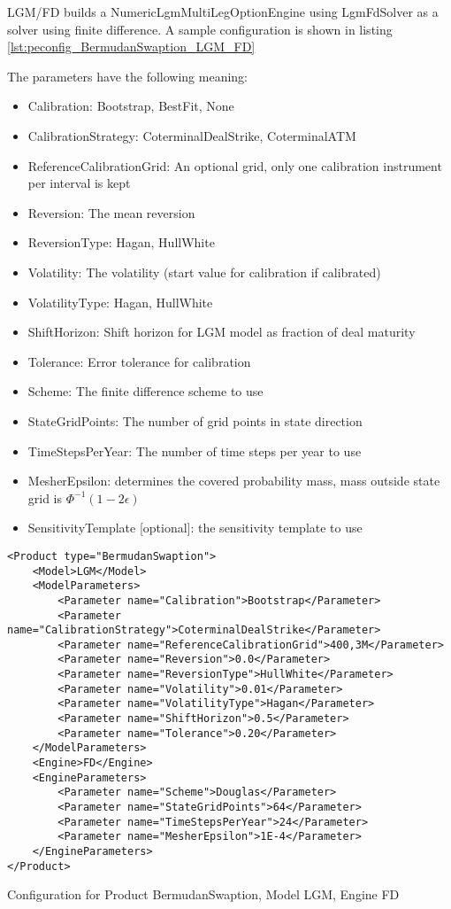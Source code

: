 LGM/FD builds a NumericLgmMultiLegOptionEngine using LgmFdSolver as a solver using finite difference. A sample
configuration is shown in listing \ref{lst:peconfig_BermudanSwaption_LGM_FD}

The parameters have the following meaning:

\begin{itemize}
\item Calibration: Bootstrap, BestFit, None
\item CalibrationStrategy: CoterminalDealStrike, CoterminalATM
\item ReferenceCalibrationGrid: An optional grid, only one calibration instrument per interval is kept
\item Reversion: The mean reversion
\item ReversionType: Hagan, HullWhite
\item Volatility: The volatility (start value for calibration if calibrated)
\item VolatilityType: Hagan, HullWhite
\item ShiftHorizon: Shift horizon for LGM model as fraction of deal maturity
\item Tolerance: Error tolerance for calibration
\item Scheme: The finite difference scheme to use
\item StateGridPoints: The number of grid points in state direction
\item TimeStepsPerYear: The number of time steps per year to use
\item MesherEpsilon: determines the covered probability mass, mass outside state grid is $\Phi^{-1}(1-2\epsilon)$
\item SensitivityTemplate [optional]: the sensitivity template to use 
\end{itemize}

\begin{longlisting}
\begin{verbatim}
<Product type="BermudanSwaption">
    <Model>LGM</Model>
    <ModelParameters>
        <Parameter name="Calibration">Bootstrap</Parameter>
        <Parameter name="CalibrationStrategy">CoterminalDealStrike</Parameter>
        <Parameter name="ReferenceCalibrationGrid">400,3M</Parameter>
        <Parameter name="Reversion">0.0</Parameter>
        <Parameter name="ReversionType">HullWhite</Parameter>
        <Parameter name="Volatility">0.01</Parameter>
        <Parameter name="VolatilityType">Hagan</Parameter>
        <Parameter name="ShiftHorizon">0.5</Parameter>
        <Parameter name="Tolerance">0.20</Parameter>
    </ModelParameters>
    <Engine>FD</Engine>
    <EngineParameters>
        <Parameter name="Scheme">Douglas</Parameter>
        <Parameter name="StateGridPoints">64</Parameter>
        <Parameter name="TimeStepsPerYear">24</Parameter>
        <Parameter name="MesherEpsilon">1E-4</Parameter>
    </EngineParameters>
</Product>
\end{verbatim}
\caption{Configuration for Product BermudanSwaption, Model LGM, Engine FD}
\label{lst:peconfig_BermudanSwaption_LGM_FD}
\end{longlisting}

